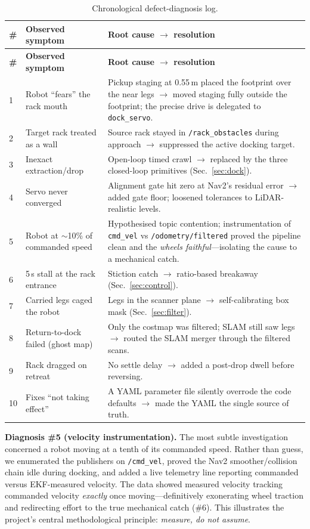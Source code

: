 \documentclass[11pt,a4paper]{article}
\newcommand{\code}[1]{\texttt{\small #1}}
\begin{document}
\begin{longtable}{@{}p{0.5cm}p{5.2cm}p{8.6cm}@{}}
\caption{Chronological defect-diagnosis log.}\label{tab:chrono}\\
\toprule
\textbf{\#} & \textbf{Observed symptom} & \textbf{Root cause $\rightarrow$ resolution}\\
\midrule
\endfirsthead
\toprule
\textbf{\#} & \textbf{Observed symptom} & \textbf{Root cause $\rightarrow$ resolution}\\
\midrule
\endhead
1 & Robot ``fears'' the rack mouth & Pickup staging at 0.55\,m placed the
 footprint over the near legs $\rightarrow$ moved staging fully outside the
 footprint; the precise drive is delegated to \code{dock\_servo}.\\
2 & Target rack treated as a wall & Source rack stayed in \code{/rack\_obstacles}
 during approach $\rightarrow$ suppressed the active docking target.\\
3 & Inexact extraction/drop & Open-loop timed crawl $\rightarrow$ replaced by the
 three closed-loop primitives (Sec.~\ref{sec:dock}).\\
4 & Servo never converged & Alignment gate hit zero at Nav2's residual error
 $\rightarrow$ added gate floor; loosened tolerances to LiDAR-realistic levels.\\
5 & Robot at $\sim$10\% of commanded speed & Hypothesised topic contention;
 instrumentation of \code{cmd\_vel} vs \code{/odometry/filtered} proved the
 pipeline clean and the \emph{wheels faithful}---isolating the cause to a
 mechanical catch.\\
6 & 5\,s stall at the rack entrance & Stiction catch $\rightarrow$ ratio-based
 breakaway (Sec.~\ref{sec:control}).\\
7 & Carried legs caged the robot & Legs in the scanner plane $\rightarrow$
 self-calibrating box mask (Sec.~\ref{sec:filter}).\\
8 & Return-to-dock failed (ghost map) & Only the costmap was filtered; SLAM
 still saw legs $\rightarrow$ routed the SLAM merger through the filtered scans.\\
9 & Rack dragged on retreat & No settle delay $\rightarrow$ added a post-drop
 dwell before reversing.\\
10 & Fixes ``not taking effect'' & A YAML parameter file silently overrode the
 code defaults $\rightarrow$ made the YAML the single source of truth.\\
\bottomrule
\end{longtable}

\textbf{Diagnosis \#5 (velocity instrumentation).} The most subtle
investigation concerned a robot moving at a tenth of its commanded speed.
Rather than guess, we enumerated the publishers on \code{/cmd\_vel}, proved
the Nav2 smoother/collision chain idle during docking, and added a live
telemetry line reporting commanded versus EKF-measured velocity. The data
showed measured velocity tracking commanded velocity \emph{exactly} once
moving---definitively exonerating wheel traction and redirecting effort to
the true mechanical catch (\#6). This illustrates the project's central
methodological principle: \emph{measure, do not assume}.
\end{document}
